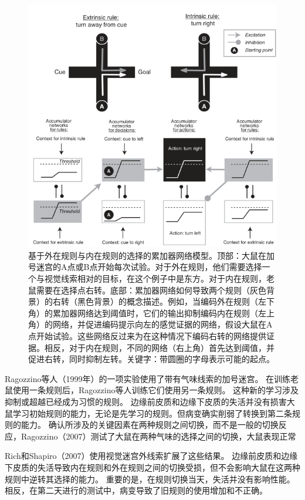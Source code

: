 \begin{figure}[!htb]
	\centering
	\includegraphics{image_pfc/Fig_3_6}
	\caption{基于外在规则与内在规则的选择的累加器网络模型。顶部：大鼠在加号迷宫的A点或B点开始每次试验。对于外在规则，他们需要选择一个与视觉线索相对的目标，在这个例子中是东方。对于内在规则，老鼠需要在选择点右转。底部：累加器网络如何导致两个规则（灰色背景）的右转（黑色背景）的概念描述。例如，当编码外在规则（左下角）的累加器网络达到阈值时，它们的输出抑制编码内在规则（左上角）的网络，并促进编码提示向左的感觉证据的网络，假设大鼠在A点开始试验。这些网络反过来为在这种情况下编码右转的网络提供证据。相反，对于内在规则，不同的网络（右上角）首先达到阈值，并促进右转，同时抑制左转。关键字：带圆圈的字母表示可能的起点。}
	\label{fig:fig}
\end{figure}


Ragozzino等人（1999年）的一项实验使用了带有气味线索的加号迷宫。
在训练老鼠使用一条规则后，Ragozzino等人训练它们使用另一条规则。
这种新的学习涉及抑制或超越已经成为习惯的规则。
边缘前皮质和边缘下皮质的失活并没有损害大鼠学习初始规则的能力，无论是先学习的规则。但病变确实削弱了转换到第二条规则的能力。
确认所涉及的关键因素在两种规则之间切换，而不是一般的切换反应，Ragozzino（2007）测试了大鼠在两种气味的选择之间的切换，大鼠表现正常\par


Rich和Shapiro（2007）使用视觉迷宫外线索扩展了这些结果。
边缘前皮质和边缘下皮质的失活导致内在规则和外在规则之间的切换受损，但不会影响大鼠在这两种规则中逆转其选择的能力。
重要的是，在规则切换当天，失活并没有影响性能。
相反，在第二天进行的测试中，病变导致了旧规则的使用增加和不正确。\par


